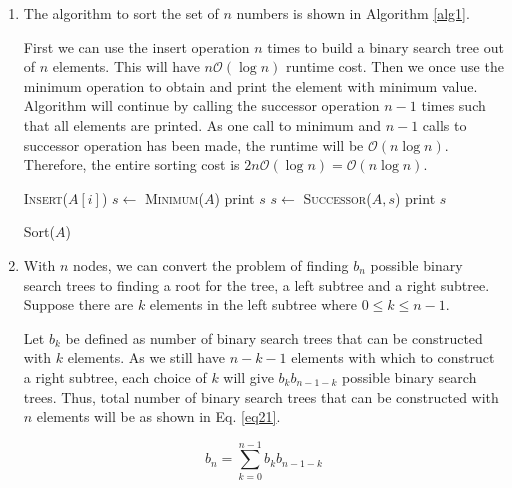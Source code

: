\begin{enumerate}[label=(\alph*)]
\item The algorithm to sort the set of $n$ numbers is shown in Algorithm \ref{alg1}.

First we can use the insert operation $n$ times to build a binary search tree out of $n$ elements.
This will have $n\mathcal{O}(\log n)$ runtime cost.
Then we once use the minimum operation to obtain and print the element with minimum value.
Algorithm will continue by calling the successor operation $n-1$ times such that all elements are printed.
As one call to minimum and $n-1$ calls to successor operation has been made, the runtime will be $\mathcal{O}(n\log n)$.
Therefore, the entire sorting cost is $2n\mathcal{O}(\log n) = \mathcal{O}(n\log n)$.

\begin{algorithm}[H]
\begin{algorithmic}[1]
\State \textsc{Insert}($A[i]$)
\EndFor
\State $s \leftarrow$ \textsc{Minimum}($A$)
\State print $s$
\State $s \leftarrow$ \textsc{Successor}($A, s$)
\State print $s$
\EndFor
\end{algorithmic}
\caption{Sort($A$)}\label{alg1}
\end{algorithm}

\item With $n$ nodes, we can convert the problem of finding $b_n$ possible binary search trees to finding a root for the tree, a left subtree and a right subtree.
Suppose there are $k$ elements in the left subtree where $0 \leq k \leq n-1$.

Let $b_k$ be defined as number of binary search trees that can be constructed with $k$ elements.
As we still have $n-k-1$ elements with which to construct a right subtree, each choice of $k$ will give $b_k b_{n-1-k}$ possible binary search trees.
Thus, total number of binary search trees that can be constructed with $n$ elements will be as shown in Eq. \ref{eq21}.

\begin{equation}
b_n = \sum_{k=0}^{n-1} b_k b_{n-1-k}
\label{eq21}
\end{equation}

\end{enumerate}

